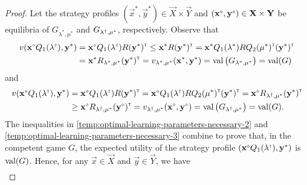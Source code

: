 \begin{proof}
        Let the strategy profiles $(\vec{x}^{*}, \vec{y}^*) \in \vec{X} \times \vec{Y}$ and $(\vec{x}^\sdiamond, \vec{y}^\sdiamond) \in \vec{X} \times \vec{Y}$ be equilibria of $G_{\lambda^*, \mu^*}$ and $G_{\lambda^\sdagger, \mu^*}$, respectively.
        Observe that
        \begin{equation}  \label{temp:optimal-learning-parameters-necessary-2}
        \begin{split}
            v(\vec{x}^\sdiamond Q_1(\lambda^\sdagger), \vec{y}^*)
                & = \vec{x}^\sdiamond Q_1(\lambda^\sdagger) R (\vec{y}^*)^\transp
                \le \vec{x}^* R (\vec{y}^*)^\transp
                = \vec{x}^* Q_1(\lambda^*) R Q_2(\mu^*)^\transp (\vec{y}^*)^\transp \\
                & = \vec{x}^* R_{\lambda^*, \mu^*} (\vec{y}^*)^\transp
                = v_{\lambda^*, \mu^*} (\vec{x}^*, \vec{y}^*)
                = \val\big(G_{\lambda^*, \mu^*}\big)
                = \val(G)
        \end{split}
        \end{equation}
        and
        \begin{equation}  \label{temp:optimal-learning-parameters-necessary-3}
        \begin{split}
            v(\vec{x}^\sdiamond Q_1(\lambda^\sdagger), \vec{y}^*)
                & = \vec{x}^\sdiamond Q_1(\lambda^\sdagger) R (\vec{y}^*)^\transp
                = \vec{x}^\sdiamond Q_1(\lambda^\sdagger) R Q_2(\mu^*)^\transp (\vec{y}^*)^\transp
                = \vec{x}^\sdiamond R_{\lambda^\sdagger, \mu^*} (\vec{y}^*)^\transp \\
                & \ge \vec{x}^\sdiamond R_{\lambda^\sdagger, \mu^*} (\vec{y}^\sdiamond)^\transp
                = v_{\lambda^\sdagger, \mu^*}(\vec{x}^\sdiamond, \vec{y}^\sdiamond)
                = \val\big(G_{\lambda^\sdagger, \mu^*}\big)
                = \val(G).
        \end{split}
        \end{equation}
        The inequalities in \eqref{temp:optimal-learning-parameters-necessary-2} and \eqref{temp:optimal-learning-parameters-necessary-3} combine to prove that, in the competent game $G$, the expected utility of the strategy profile $(\vec{x}^\sdiamond Q_1(\lambda^\sdagger), \vec{y}^*)$ is $\operatorname{val}(G)$.
        Hence, for any $\vec{x} \in \vec{X}$ and $\vec{y} \in \vec{Y}$, we have
        \begin{equation} \label{temp:optimal-learning-parameters-necessary-4}
        \begin{split}

\end{split}
\end{equation}
\end{proof}

